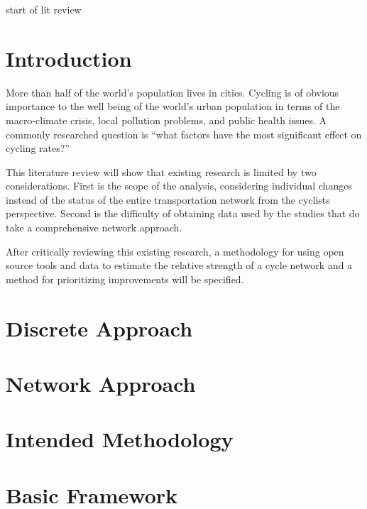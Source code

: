 \documentclass[11pt]{article} %
\begin{document}



start of lit review

\section{Introduction}

More than half of the world's population lives in cities. Cycling is of obvious importance to the well being of the world's  urban population in terms of the macro-climate crisis, local pollution problems, and public health issues. A commonly researched question is ``what factors have the most significant effect on cycling rates?''

This literature review will show that existing research is limited by two considerations. First is the scope of the analysis, considering individual changes instead of the status of the entire transportation network from the cyclists perspective.  Second is the difficulty of obtaining data used by the studies that do take a comprehensive network approach. 

After critically reviewing this existing research, a methodology for using open source tools and data to estimate the relative strength of a cycle network and a method for prioritizing improvements will be specified. 

\section{Discrete Approach}

\section{Network Approach}

\section{Intended Methodology}







\section{Basic Framework}
\end{document}
